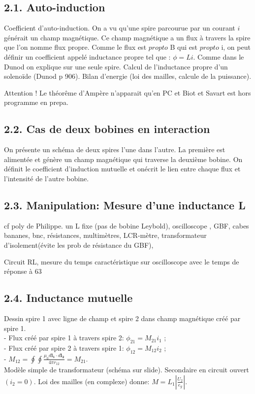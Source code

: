 \documentclass[french, a4paper, 10pt, twocolumn, landscape]{article}
\begin{document}
\subsection*{2.1. Auto-induction}

Coefficient d'auto-induction. On a vu qu'une spire parcourue par un courant $i$ générait un champ magnétique. Ce champ magnétique a un flux à travers la spire que l'on nomme flux propre. Comme le flux est $propto$ B qui est $propto$ i, on peut définir un coefficient appelé inductance propre tel que : $\phi=Li$. Comme dans le Dunod on explique sur une seule spire. Calcul de l'inductance propre d'un solenoïde (Dunod p 906). Bilan d'energie (loi des mailles, calcule de la puissance).

Attention ! Le théorême d'Ampère n'apparait qu'en PC et Biot et Savart est hors programme en prepa.

\subsection*{2.2. Cas de deux bobines en interaction}
On présente un schéma de deux spires l'une dans l'autre. La première est alimentée et génère un champ magnétique qui traverse la deuxième bobine. On définit le coefficient d'induction mutuelle et onécrit le lien entre chaque flux et l'intensité de l'autre bobine.

\subsection*{2.3. Manipulation: Mesure d'une inductance L}

cf poly de Philippe. un L fixe (pas de bobine Leybold), oscilloscope , GBF, cabes bananes, bnc, résistances, multimètres, LCR-mètre, transformateur d'isolement(évite les prob de résistance du GBF),

Circuit RL, mesure du temps caractéristique sur oscilloscope avec le temps de réponse à 63%

\subsection*{2.4. Inductance mutuelle}
Dessin spire 1 avec ligne de champ et spire 2 dans champ magnétique créé par spire 1. \\
- Flux créé par spire 1 à travers spire 2: $\phi_{21} = M_{21} i_1$ ; \\
- Flux créé par spire 2 à travers spire 1: $\phi_{12} = M_{12} i_2$ ; \\
- $M_{12} = \oint \oint \frac{\mu_0 d \mathbf{l_1} \cdot d \mathbf{l_2}}{4 \pi r_{12}} = M_{21}$. \\
 Modèle simple de transformateur (schéma sur slide). Secondaire en circuit ouvert $(i_2 = 0)$. Loi des mailles (en complexe) donne: $ M = L_1 \left| \frac{U_2}{e_g} \right|$. 
 
\end{document}
